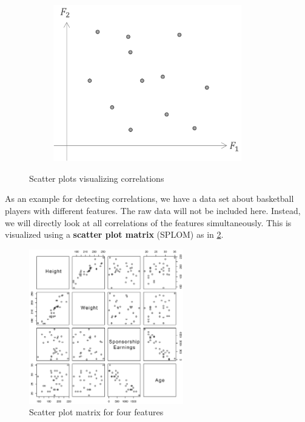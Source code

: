 \begin{figure}[H]
  \begin{subfigure}{0.3\textwidth}
    \centering
    \includegraphics[width=0.9\textwidth]{assets/visualization_and_extraction/feature_relation/scatter_not_cor.png}
  \end{subfigure}
  \caption{Scatter plots visualizing correlations}
  \label{fig:2_correlation}
\end{figure}

As an example for detecting correlations, we have a data set about basketball players with different features. The raw data will not be included here. Instead, we will directly look at all correlations of the features simultaneously. This is visualized using a \textbf{scatter plot matrix} (SPLOM) as in \ref{fig:2_splom}.

\begin{figure}[h]
  \centering
  \includegraphics[width=0.6\textwidth]{assets/visualization_and_extraction/feature_relation/splom.png}
  \caption{Scatter plot matrix for four features}
  \label{fig:2_splom}
\end{figure}

